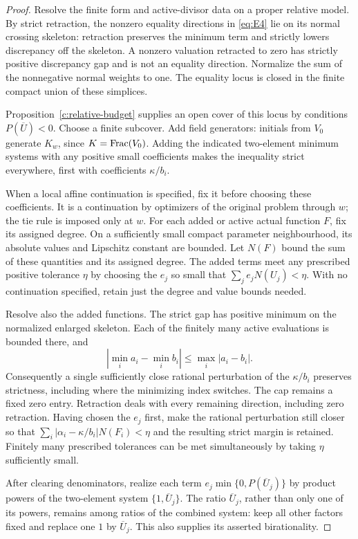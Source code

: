 \begin{proof}
Resolve the finite form and active-divisor data on a proper
relative model.  By strict retraction, the nonzero equality
directions in \eqref{eq:E4} lie on its normal crossing skeleton:
retraction preserves the minimum term and strictly lowers
discrepancy off the skeleton.  A nonzero valuation retracted
to zero has strictly positive discrepancy gap and is not an
equality direction.  Normalize the sum of the nonnegative
normal weights to one.  The equality locus is closed in the
finite compact union of these simplices.

Proposition~\ref{c:relative-budget} supplies an open cover of
this locus by conditions \(P(\overline U)<0\).  Choose a finite
subcover.  Add field generators: initials from \(V_0\) generate
\(K_w\), since \(K=\operatorname{Frac}(V_0)\).  Adding the indicated
two-element minimum systems with any positive small coefficients
makes the inequality strict everywhere, first with coefficients
\(\kappa/b_i\).

When a local affine continuation is specified, fix it before
choosing these coefficients.  It is a continuation by optimizers
of the original problem through \(w\); the tie rule is imposed
only at \(w\).  For each added or active actual function \(F\),
fix its assigned degree.  On a sufficiently small compact
parameter neighbourhood, its absolute values and Lipschitz
constant are bounded.  Let \(N(F)\) bound the sum of these
quantities and its assigned degree.  The added terms meet any
prescribed positive tolerance \(\eta\) by choosing the \(e_j\)
so small that \(\sum_j e_jN(U_j)<\eta\).  With no continuation
specified, retain just the degree and value bounds needed.

Resolve also the added functions.  The strict gap has positive
minimum on the normalized enlarged skeleton.  Each of the
finitely many active evaluations is bounded there, and
\[
       |\min_i a_i-\min_i b_i|\le\max_i|a_i-b_i|.
\]
Consequently a single sufficiently close rational perturbation
of the \(\kappa/b_i\) preserves strictness, including where
the minimizing index switches.  The cap remains a fixed zero
entry.  Retraction deals with every remaining direction,
including zero retraction.  Having chosen the \(e_j\) first,
make the rational perturbation still closer so that
\(\sum_i|\alpha_i-\kappa/b_i|N(F_i)<\eta\) and the resulting
strict margin is retained.  Finitely many prescribed tolerances
can be met simultaneously by taking \(\eta\) sufficiently small.

After clearing denominators, realize each term
\(e_j\min\{0,P(\overline U_j)\}\) by product powers of the
two-element system \(\{1,\overline U_j\}\).
The ratio \(\overline U_j\), rather than only one of its powers,
remains among ratios of the combined system: keep all other
factors fixed and replace one \(1\) by \(\overline U_j\).
This also supplies its asserted birationality.
\end{proof}
